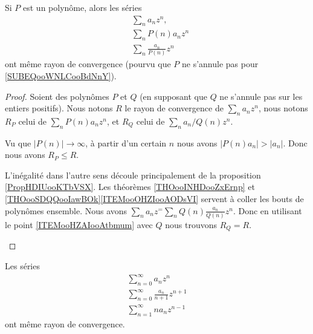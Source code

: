 \begin{proposition}	\label{PROPooGQAIooFDTtrc}
	Si \( P\) est un polynôme, alors les séries
	\begin{subequations}
		\begin{align}
			 & \sum_na_nz^n,                                             \\
			 & \sum_nP(n)a_nz^n                                          \\
			 & \sum_n\frac{ a_n }{ P(n) }z^n		\label{SUBEQooWNLCooBdNnY}
		\end{align}
	\end{subequations}
	ont même rayon de convergence (pourvu que \( P\) ne s'annule pas pour \ref{SUBEQooWNLCooBdNnY}).
\end{proposition}

\begin{proof}

	Soient des polynômes \( P\) et \( Q\) (en supposant que \( Q\) ne s'annule pas sur les entiers positifs). Nous notons \( R\) le rayon de convergence de \( \sum_na_nz^n\), nous notons \( R_P\) celui de \( \sum_nP(n)a_nz^n\), et \( R_Q\) celui de \( \sum_na_n/Q(n)z^n\).

	\begin{subproof}
		\spitem[\( R=R_P\)]		\label{ITEMooHZAIooAtbmum}
		Vu que \( | P(n) |\to \infty\), à partir d'un certain \( n\) nous avons \( | P(n)a_n |>| a_n |\). Donc nous avons \( R_P\leq R\).

		L'inégalité dans l'autre sens découle principalement de la proposition \ref{PropHDIUooKTbVSX}. Les théorèmes \ref{THOooINHDooZxErnp} et \ref{THOooSDQQooIawBOk}\ref{ITEMooOHZIooAODsVI} servent à coller les bouts de polynômes ensemble.
		\spitem[\( R_Q=R\)]
		Nous avons \( \sum_na_nz^=\sum_nQ(n)\frac{ a_n }{ Q(n) }z^n\). Donc en utilisant le point \ref{ITEMooHZAIooAtbmum} avec \( Q\) nous trouvons \( R_Q=R\).
	\end{subproof}
\end{proof}

\begin{lemma}       \label{LemFVMaSD}
	Les séries
	\begin{subequations}
		\begin{align}
			\sum_{n=0}^{\infty}a_nz^n                     \\
			\sum_{n=0}^{\infty}\frac{ a_n }{ n+1 }z^{n+1} \\
			\sum_{n=1}^{\infty}na_nz^{n-1}
		\end{align}
	\end{subequations}
	ont même rayon de convergence.
\end{lemma}

